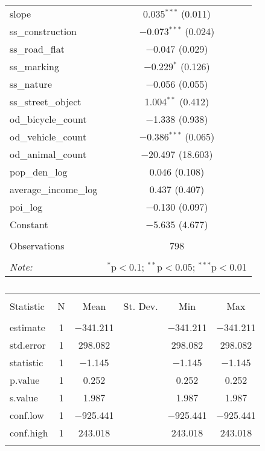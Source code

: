 \begin{table}[!htbp]
\begin{tabular}{@{\extracolsep{1pt}}lc}
  slope & 0.035$^{***}$ (0.011) \\ 
  ss\_construction & $-$0.073$^{***}$ (0.024) \\ 
  ss\_road\_flat & $-$0.047 (0.029) \\ 
  ss\_marking & $-$0.229$^{*}$ (0.126) \\ 
  ss\_nature & $-$0.056 (0.055) \\ 
  ss\_street\_object & 1.004$^{**}$ (0.412) \\ 
  od\_bicycle\_count & $-$1.338 (0.938) \\ 
  od\_vehicle\_count & $-$0.386$^{***}$ (0.065) \\ 
  od\_animal\_count & $-$20.497 (18.603) \\ 
  pop\_den\_log & 0.046 (0.108) \\ 
  average\_income\_log & 0.437 (0.407) \\ 
  poi\_log & $-$0.130 (0.097) \\ 
  Constant & $-$5.635 (4.677) \\ 
 \hline \\[-1.8ex] 
Observations & 798 \\ 
\hline 
\hline \\[-1.8ex] 
\textit{Note:}  & \multicolumn{1}{r}{$^{*}$p$<$0.1; $^{**}$p$<$0.05; $^{***}$p$<$0.01} \\ 
\end{tabular} 
\end{table} 

\begin{table}[!htbp] \centering 
  \caption{} 
  \label{} 
\small 
\begin{tabular}{@{\extracolsep{1pt}}lccccc} 
\\[-1.8ex]\hline 
\hline \\[-1.8ex] 
Statistic & \multicolumn{1}{c}{N} & \multicolumn{1}{c}{Mean} & \multicolumn{1}{c}{St. Dev.} & \multicolumn{1}{c}{Min} & \multicolumn{1}{c}{Max} \\ 
\hline \\[-1.8ex] 
estimate & 1 & $-$341.211 &  & $-$341.211 & $-$341.211 \\ 
std.error & 1 & 298.082 &  & 298.082 & 298.082 \\ 
statistic & 1 & $-$1.145 &  & $-$1.145 & $-$1.145 \\ 
p.value & 1 & 0.252 &  & 0.252 & 0.252 \\ 
s.value & 1 & 1.987 &  & 1.987 & 1.987 \\ 
conf.low & 1 & $-$925.441 &  & $-$925.441 & $-$925.441 \\ 
conf.high & 1 & 243.018 &  & 243.018 & 243.018 \\ 
\hline \\[-1.8ex] 
\end{tabular} 
\end{table} 

